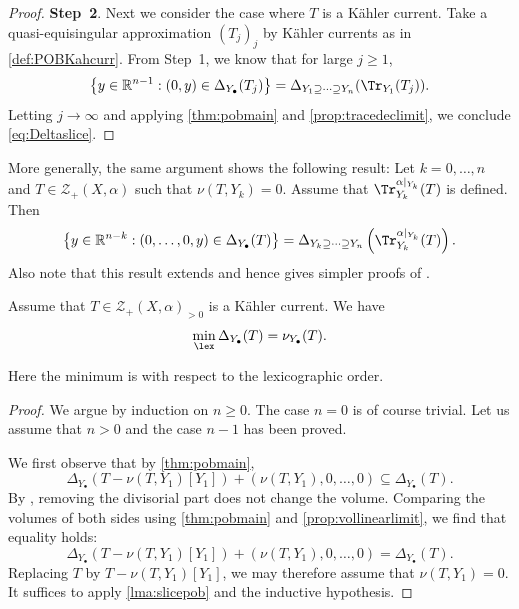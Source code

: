\begin{proof}
    \textbf{Step~2}.
    Next we consider the case where $T$ is a Kähler current. Take a quasi-equisingular approximation $(T_j)_j$ by Kähler currents as in \cref{def:POBKahcurr}. From Step~1, we know that for large $j\geq 1$,
    \[
    \left\{y\in \mathbb{R}^{n-1}: (0,y)\in \Delta_{Y_{\bullet}}(T_j)\right\}=\Delta_{Y_1\supseteq \cdots \supseteq Y_n}(\Tr_{Y_1}(T_j)).
    \]
    Letting $j\to\infty$ and applying \cref{thm:pobmain} and \cref{prop:tracedeclimit}, we conclude \eqref{eq:Deltaslice}.
\end{proof}

\begin{remark}\label{rmk:slicepob}
    More generally, the same argument shows the following result: Let $k=0,\ldots,n$ and $T\in \mathcal{Z}_+(X,\alpha)$ such that $\nu(T,Y_k)=0$. Assume that $\Tr^{\alpha|_{Y_k}}_{Y_k}(T)$ is defined. Then
    \begin{equation}
        \left\{ y\in \mathbb{R}^{n-k}: (0,\ldots,0,y)\in \Delta_{Y_{\bullet}}(T)\right\}=\Delta_{Y_k\supseteq \cdots \supseteq Y_n}\left(\Tr^{\alpha|_{Y_k}}_{Y_k}(T)\right).
    \end{equation}
    Also note that this result extends \cite[Theorem~3.4]{Jow10} and hence gives simpler proofs of \cite[Theorem~A, Theorem~B]{Jow10}.
\end{remark}

\begin{theorem}\label{thm:KahcurrminOkoun}
Assume that $T\in \mathcal{Z}_+(X,\alpha)_{>0}$ is a Kähler current.
We have
\begin{equation}\label{eq:minOkounkov}
    \min_{\lex} \Delta_{Y_{\bullet}}(T)=\nu_{Y_{\bullet}}(T).
\end{equation}
\end{theorem}
Here the minimum is with respect to the lexicographic order.
\begin{proof}
We argue by induction on $n\geq 0$. The case $n=0$ is of course trivial. Let us assume that $n>0$ and the case $n-1$ has been proved.

We first observe that by \cref{thm:pobmain},
\[
\Delta_{Y_{\bullet}}(T-\nu(T,Y_1)[Y_1])+(\nu(T,Y_1),0,\ldots,0)\subseteq \Delta_{Y_{\bullet}}(T).
\]
By , removing the divisorial part does not change the volume. Comparing the volumes of both sides using \cref{thm:pobmain} and \cref{prop:vollinearlimit}, we find that equality holds:
\[
\Delta_{Y_{\bullet}}(T-\nu(T,Y_1)[Y_1])+(\nu(T,Y_1),0,\ldots,0)=\Delta_{Y_{\bullet}}(T).
\]
Replacing $T$ by $T-\nu(T,Y_1)[Y_1]$, we may therefore assume that $\nu(T,Y_1)=0$. It suffices to apply \cref{lma:slicepob} and the inductive hypothesis.
\end{proof}

